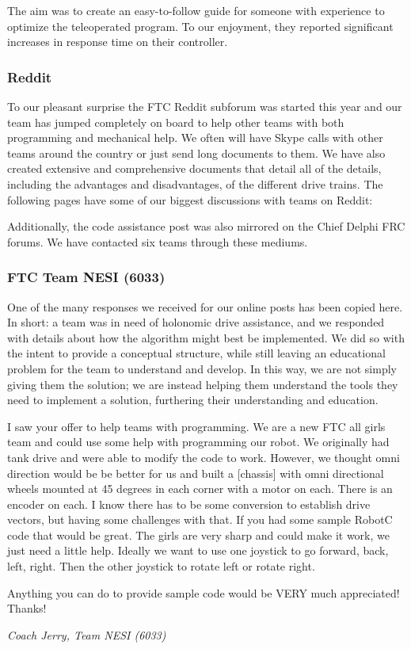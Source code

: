 

The aim was to create an easy-to-follow guide for someone with experience to optimize the teleoperated program. To our enjoyment, they reported significant increases in response time on their controller.

\subsubsection{Reddit}
To our pleasant surprise the FTC Reddit subforum was started this year and our team has jumped completely on board to help other teams with both programming and mechanical help. We often will have Skype calls with other teams around the country or just send long documents to them. We have also created extensive and comprehensive documents that detail all of the details, including the advantages and disadvantages, of the different drive trains. The following pages have some of our biggest discussions with teams on Reddit:





Additionally, the code assistance post was also mirrored on the Chief Delphi FRC forums. We have contacted six teams through these mediums. 

\subsubsection{FTC Team NESI (6033)}

One of the many responses we received for our online posts has been copied here. In short: a team was in need of holonomic drive assistance, and we responded with details about how the algorithm might best be implemented. We did so with the intent to provide a conceptual structure, while still leaving an educational problem for the team to understand and develop. In this way, we are not simply giving them the solution; we are instead helping them understand the tools they need to implement a solution, furthering their understanding and education.

\begin{fancyquotes}
I saw your offer to help teams with programming. We are a new FTC all girls team and could use some help with programming our robot. We originally had tank drive and were able to modify the code to work. However, we thought omni direction would be be better for us and built a [chassis] with omni directional wheels mounted at 45 degrees in each corner with a motor on each. There is an encoder on each. I know there has to be some conversion to establish drive vectors, but having some challenges with that. If you had some sample RobotC code that would be great. The girls are very sharp and could make it work, we just need a little help. Ideally we want to use one joystick to go forward, back, left, right. Then the other joystick to rotate left or rotate right.
 
Anything you can do to provide sample code would be VERY much appreciated! Thanks!

\textit{Coach Jerry, Team NESI (6033)}
\end{fancyquotes}

